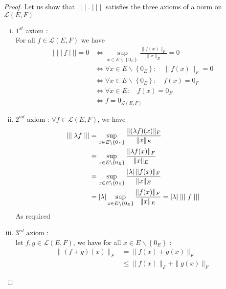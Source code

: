  \begin{proof}
 Let us show that $\mid \mid \mid \ . \mid \mid \mid $ 
 satisfies the three axioms of a norm on 
 $\mathcal{L} (E,F) $ 
 \begin{enumerate}[(i)]
 \item $1^{st}$ axiom : 
	 \\
	 For all $f \in \mathcal{L} \left( E,F \right)$ we have
	 \begin{align*}
		 \mid \mid \mid \ f \mid \mid \mid = 0 &
		 \iff \sup_{x \in E \backslash 
		 \left\{ 0_{E} \right\}}  
		 \frac{\| f(x)  \| _{F}}{ \| x \| _{E}} = 0 
		 \\
	       & \iff  \forall x \in E \backslash 
	       \left\{ 0_{E} \right\} : 
	       \quad \| f(x)  \| _{F} = 0 \\
	       & \iff \forall  x \in 
	       E \backslash \left\{ 0_{E} \right\} :
	       \quad f(x) = 0_{F} \\
	       & \iff \forall x \in E: \quad f(x)  = 0_{F} 
	     \\
	       &\iff f = 0_{\mathcal{L} \left( E,F \right)}
	 \end{align*}
	\item $2^{nd}$ axiom : 
		$\forall f \in \mathcal{L} \left( E,F \right)$, we have
		\begin{align*}
			\mid \mid \mid  \lambda f   \mid \mid \mid  
			&= 
			\sup_{x \in E \backslash \left\{ 0_{E} \right\}} 
			\frac{\| (\lambda f) (x)  \|_{F} }{
			\| x \| _{E}} \\
			&= 
			\sup_{x \in E \backslash \left\{ 0_{E} \right\}} 
			\frac{\|  \lambda f(x)  \| _{F}}{
			\| x \| _{E}} \\
			&=
			\sup_{x \in E \backslash \left\{ 0_{E} \right\}} 
			\frac{ \left| \lambda \right| 
			\| f(x)  \| _{F}}{ \| x \| _{E}} \\
			&= \left| \lambda \right| 
			\sup_{x \in E \backslash \left\{ 0_{E} \right\}}  
			\frac{\| f(x)  \| _{F}}{
			\| x \|_{E} } =
			\left| \lambda \right| 
			\mid \mid \mid  f \mid \mid \mid 
		\end{align*}
		As required
	\item $3^{rd}$ axiom : \\
		let $f,g \in \mathcal{L} (E,F) $, we have
		for all $x \in E \backslash \left\{ 0_{E} \right\}$ : 
		\begin{align*}
			\| (f+g) (x)  \| _{F} &=
			\| f(x)  + g(x)  \| _{F} \\
					      & \leq 
					      \| f(x)  \| _{F} + 
					      \| g(x)  \| _{F}
		\end{align*}

\end{enumerate}
\end{proof}
